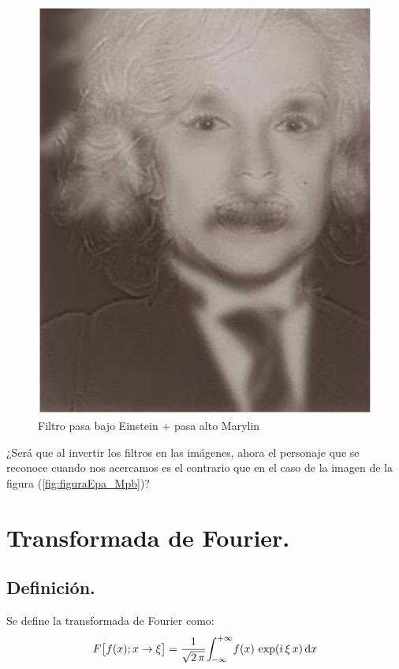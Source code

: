\begin{figure}[H]
    \centering
    \includegraphics[scale=0.35]{Imagenes/Einstein_Marylin_BA_01.eps}
    \caption{Filtro pasa bajo Einstein + pasa alto Marylin}
\end{figure}

¿Será que al invertir los filtros en las imágenes, ahora el personaje que se reconoce cuando nos acercamos es el contrario que en el caso de la imagen de la figura (\ref{fig:figuraEpa_Mpb})?

\section{Transformada de Fourier.}

\subsection{Definición.}

Se define la transformada de Fourier como:
\begin{align}
F \big[ f(x); x \to \xi \big] = \dfrac{1}{\sqrt{2 \, \pi}} \scaleint{5ex}_{\bs -\infty}^{+\infty} f(x) \, \exp(i \, \xi \, x) \dd{x}
\label{eq:ecuacion_01_12}
\end{align}

